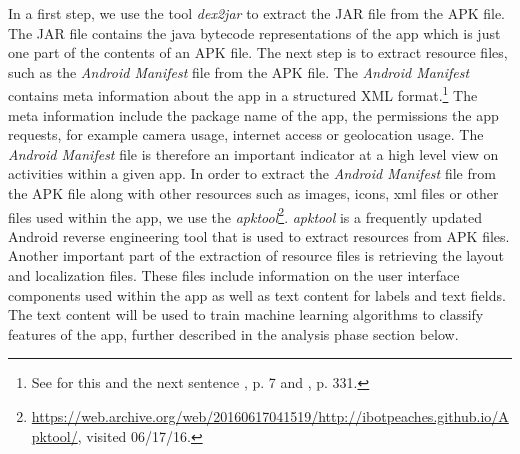 In a first step, we use the tool \textit{dex2jar} to extract the \acs{JAR} file from the APK file.
The JAR file contains the java bytecode representations of the app which is just one part of the contents of an \acs{APK} file.
The next step is to extract resource files, such as the \textit{Android Manifest} file from the APK file.
The \textit{Android Manifest} contains meta information about the app in a structured XML format.\footnote{See for this and the next sentence \cite{xu2013}, p. 7 and \cite{Shabtai2010}, p. 331.}
The meta information include the package name of the app, the permissions the app requests, for example camera usage, internet access or geolocation usage.
The \textit{Android Manifest} file is therefore an important indicator at a high level view on activities within a given app.
In order to extract the \textit{Android Manifest} file from the APK file along with other resources such as images, icons, xml files or other files used within the app, we use the \textit{apktool}\footnote{\url{https://web.archive.org/web/20160617041519/http://ibotpeaches.github.io/Apktool/}, visited 06/17/16.}.
\textit{apktool} is a frequently updated Android reverse engineering tool that is used to extract resources from APK files.
Another important part of the extraction of resource files is retrieving the layout and localization files.
These files include information on the user interface components used within the app as well as text content for labels and text fields.
The text content will be used to train machine learning algorithms to classify features of the app, further described in the analysis phase section below.

